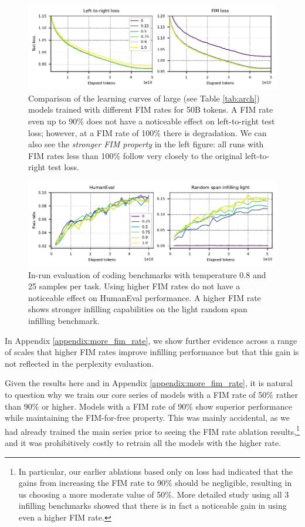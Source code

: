 \documentclass[postscript]{article}
\begin{document}
\begin{figure}[ht!]
\centering
\includegraphics[width=\textwidth]{figures/fim-rate-loss-curves.pdf}
\caption{Comparison of the learning curves of large (see Table \ref{tab:arch}) models trained with different FIM rates for 50B tokens. A FIM rate even up to 90\% does not have a noticeable effect on left-to-right test loss; however, at a FIM rate of 100\% there is degradation. We can also see the \emph{stronger FIM property} in the left figure: all runs with FIM rates less than 100\% follow very closely to the original left-to-right test loss.  }
\label{fig:pretraining:fim-rate1}
\end{figure}

\begin{figure}[ht!]
\centering
\includegraphics[width=\textwidth]{figures/fim-rate-eval-curves.pdf}
\caption{In-run evaluation of coding benchmarks with temperature 0.8 and 25 samples per task. Using higher FIM rates do not have a noticeable effect on HumanEval performance. A higher FIM rate shows stronger infilling capabilities on the light random span infilling benchmark.}\label{fig:pretraining:fim-rate2}
\end{figure}

In Appendix \ref{appendix:more_fim_rate}, we show further evidence across a range of scales that higher FIM rates improve infilling performance but that this gain is not reflected in the perplexity evaluation. 

Given the results here and in Appendix \ref{appendix:more_fim_rate}, it is natural to question why we train our core series of models with a FIM rate of 50\% rather than 90\% or higher. Models with a FIM rate of 90\% show superior performance while maintaining the FIM-for-free property. This was mainly accidental, as we had already trained the main series prior to seeing the FIM rate ablation results,\footnote{In particular, our earlier ablations based only on loss had indicated that the gains from increasing the FIM rate to 90\% should be negligible, resulting in us choosing a more moderate value of 50\%. More detailed study using all 3 infilling benchmarks showed that there is in fact a noticeable gain in using even a higher FIM rate.} and it was prohibitively costly to retrain all the models with the higher rate.  
\end{document}
